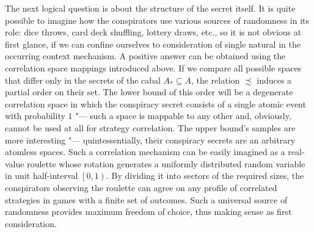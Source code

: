The next logical question is about the structure of the secret itself. It is quite possible to imagine how the conspirators use various sources of randomness in its role: dice throws, card deck shuffling, lottery draws, etc., so it is not obvious at first glance, if we can confine ourselves to consideration of single natural in the occurring context mechanism. A positive answer can be obtained using the correlation space mappings introduced above. If we compare all possible spaces that differ only in the secrets of the cabal $A_* \subseteq A$, the relation $\precsim$ induces a partial order on their set. The lower bound of this order will be a degenerate correlation space in which the conspiracy secret consists of a single atomic event with probability $1$ "--- such a space is mappable to any other and, obviously, cannot be used at all for strategy correlation. The upper bound's samples are more interesting "--- quintessentially, their conspiracy secrets are an arbitrary atomless \cite[с.~81]{Bogachev} spaces. Such a correlation mechanism can be easily imagined as a real-value roulette whose rotation generates a uniformly distributed random variable in unit half-interval $\left[0, 1\right)$. By dividing it into sectors of the required sizes, the conspirators observing the roulette can agree on any profile of correlated strategies in games with a finite set of outcomes. Such a universal source of randomness provides maximum freedom of choice, thus making sense as first consideration. %

